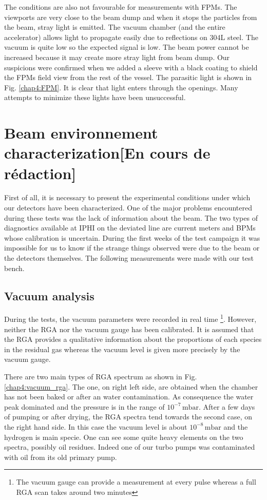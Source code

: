 \begin{refsection}
  The conditions are also not favourable for measurements with FPMs. The viewports are very close to the beam dump and when it stops the particles from the beam, stray light is emitted. The vacuum chamber (and the entire accelerator) allows light to propagate easily due to reflections on 304L steel. The vacuum is quite low so the expected signal is low. The beam power cannot be increased because it may create more stray light from beam dump. Our suspicions were confirmed when we added a sleeve with a black coating to shield the FPMs field view from the rest of the vessel. The parasitic light is shown in Fig. \ref{chap4:FPM}. It is clear that light enters through the openings. Many attempts to minimize these lights have been unsuccessful.

  

  \section{Beam environnement characterization[En cours de rédaction]}
  First of all, it is necessary to present the experimental conditions under which our detectors have been characterized. One of the major problems encountered during these tests was the lack of information about the beam. The two types of diagnostics available at IPHI on the deviated line are current meters and BPMs whose calibration is uncertain. During the first weeks of the test campaign it was impossible for us to know if the strange things observed were due to the beam or the detectors themselves. The following measurements were made with our test bench.
  
  \subsection{Vacuum analysis}
  \label{sec4:vacuum}
  During the tests, the vacuum parameters were recorded in real time \footnote{The vacuum gauge can provide a measurement at every pulse whereas a full RGA scan takes around two minutes}. However, neither the RGA nor the vacuum gauge has been calibrated. It is assumed that the RGA provides a qualitative information about the proportions of each species in the residual gas whereas the vacuum level is given more precisely by the vacuum gauge.

  There are two main types of RGA spectrum as shown in Fig. \ref{chap4:vacuum_rga}. The one, on right left side, are obtained when the chamber has not been baked or after an water contamination. As consequence the water peak dominated and the pressure is in the range of $10^{-7}\,\mathrm{mbar}$. After a few days of pumping or after drying, the RGA spectra tend towards the second case, on the right hand side. In this case the vacuum level is about $10^{-8}\,\mathrm{mbar}$ and the hydrogen is main specie. One can see some quite heavy elements on the two spectra, possibly oil residues. Indeed one of our turbo pumps was contaminated with oil from its old primary pump.


\end{refsection}
